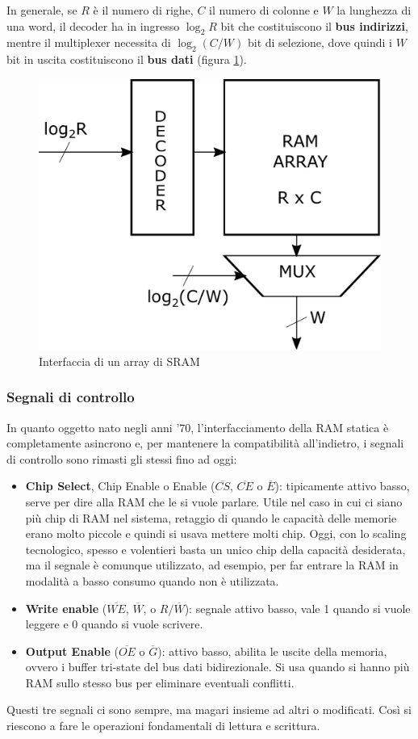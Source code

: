 \documentclass[11pt,4paper]{report}
\begin{document}
In generale, se $R$ è il numero di righe, $C$ il numero di colonne e $W$ la lunghezza di una word, il decoder ha in ingresso $\log_2{R}$ bit che costituiscono il \textbf{bus indirizzi}, mentre il multiplexer necessita di $\log_2{(C/W)}$ bit di selezione, dove quindi i $W$ bit in uscita costituiscono il \textbf{bus dati} (figura \ref{fig:sram_array}).
\begin{figure}[hbtp]
	\centering
	\includegraphics[width=0.4\linewidth]{memorie/sram_array.pdf}
	\caption{Interfaccia di un array di SRAM}
	\label{fig:sram_array}
\end{figure}


\subsubsection{Segnali di controllo}
In quanto oggetto nato negli anni '70, l'interfacciamento della RAM statica è completamente asincrono e, per mantenere la compatibilità all'indietro, i segnali di controllo sono rimasti gli stessi fino ad oggi:
\begin{itemize}
	\item \textbf{Chip Select}, Chip Enable o Enable ($\overline{CS}$, $\overline{CE}$ o $\overline{E}$): tipicamente attivo basso, serve per dire alla RAM che le si vuole parlare. Utile nel caso in cui ci siano più chip di RAM nel sistema, retaggio di quando le capacità delle memorie erano molto piccole e quindi si usava mettere molti chip. Oggi, con lo scaling tecnologico, spesso e volentieri basta un unico chip della capacità desiderata, ma il segnale è comunque utilizzato, ad esempio, per far entrare la RAM in modalità a basso consumo quando non è utilizzata.
	\item \textbf{Write enable} ($\overline{WE}$, $\overline{W}$, o $R/\overline{W}$): segnale attivo basso, vale 1 quando si vuole leggere e 0 quando si vuole scrivere.
	\item \textbf{Output Enable} ($\overline{OE}$ o $\overline{G}$): attivo basso, abilita le uscite della memoria, ovvero i buffer tri-state del bus dati bidirezionale. Si usa quando si hanno più RAM sullo stesso bus per eliminare eventuali conflitti.
\end{itemize}
Questi tre segnali ci sono sempre, ma magari insieme ad altri o modificati. Così si riescono a fare le operazioni fondamentali di lettura e scrittura.
\end{document}
